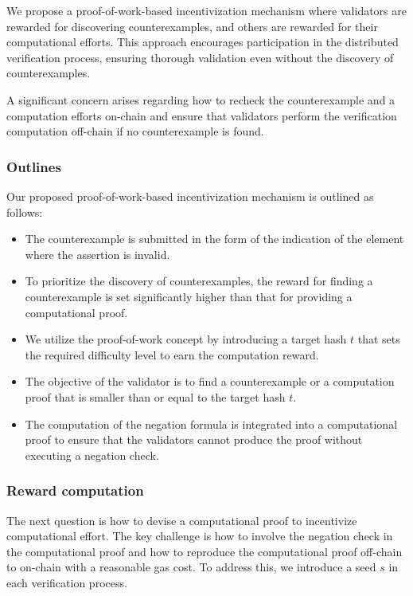 \documentclass[runningheads]{llncs}
\begin{document}
We propose a proof-of-work-based incentivization mechanism where validators are rewarded for discovering counterexamples, and others are rewarded for their computational efforts. This approach encourages participation in the distributed verification process, ensuring thorough validation even without the discovery of counterexamples.

A significant concern arises regarding how to recheck the counterexample and a computation efforts on-chain and ensure that validators perform the verification computation off-chain if no counterexample is found.
\subsubsection{Outlines}
Our proposed proof-of-work-based incentivization mechanism is outlined as follows:
\begin{itemize}
\item The counterexample is submitted in the form of the indication of the element where the assertion is invalid.
\item To prioritize the discovery of counterexamples, the reward for finding a counterexample is set significantly higher than that for providing a computational proof.
\item We utilize the proof-of-work concept by introducing a target hash \( t \) that sets the required difficulty level to earn the computation reward.
\item The objective of the validator is to find a counterexample or a computation proof that is smaller than or equal to the target hash \( t \).
\item The computation of the negation formula is integrated into a computational proof to ensure that the validators cannot produce the proof without executing a negation check.
\end{itemize}
\subsubsection{Reward computation}
The next question is how to devise a computational proof to incentivize computational effort. The key challenge is how to involve the negation check in the computational proof and how to reproduce the computational proof off-chain to on-chain with a reasonable gas cost. To address this, we introduce a seed $s$ in each verification process.
\end{document}
